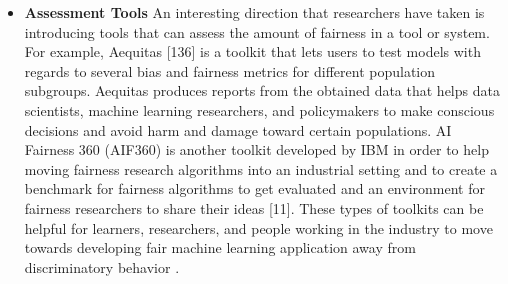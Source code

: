 \documentclass[12pt, a4paper, oneside]{book}   	%
\begin{document}
\begin{itemize}
				\item \textbf{Assessment Tools} An interesting direction that researchers have taken is introducing tools that can assess the amount of fairness in a tool or system. For example, Aequitas [136] is a toolkit that lets users to test models with regards to several bias and fairness metrics for different population subgroups. Aequitas produces reports from the obtained data that helps data scientists, machine learning researchers, and policymakers to make conscious decisions and avoid harm and damage toward certain populations. AI Fairness 360 (AIF360) is another toolkit developed by IBM in order to help moving fairness research algorithms into an industrial setting and to create a benchmark for fairness algorithms to get evaluated and an environment for fairness researchers to share their ideas [11]. These types of toolkits can be helpful for learners, researchers, and people working in the industry to move towards developing fair machine learning application away from discriminatory behavior \autocite{Mehrabi_2021}.
			\end{itemize}	
			
\end{document}
